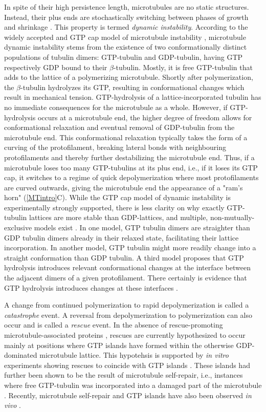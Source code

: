 In spite of their high persistence length, microtubules are no static structures. Instead, their plus ends are stochastically switching between phases of growth and shrinkage \parencite{Janosi2002}. This property is termed \textit{dynamic instability}. According to the widely accepted and GTP cap model of microtubule instability , microtubule dynamic instability stems from the existence of two conformationally distinct populations of tubulin dimers: GTP-tubulin and GDP-tubulin, having GTP respectively GDP bound to their $\beta$-tubulin. Mostly, it is free GTP-tubulin that adds to the lattice of a polymerizing microtubule. Shortly after polymerization, the $\beta$-tubulin hydrolyzes its GTP, resulting in conformational changes which result in mechanical tension. GTP-hydrolysis of a lattice-incorporated tubulin has no immediate consequences for the microtubule as a whole. However, if GTP-hydrolysis occurs at a microtubule end, the higher degree of freedom allows for conformational relaxation and eventual removal of GDP-tubulin from the microtubule end. This conformational relaxation typically takes the form of a curving of the protofilament, breaking lateral bonds with neighbouring protofilaments and thereby further destabilizing the microtubule end. Thus, if a microtubule loses too many GTP-tubulins at its plus end, i.e., if it loses its GTP cap, it switches to a regime of quick depolymerization where most protofilaments are curved outwards, giving the microtubule end the appearance of a "ram's horn" (\autoref{MTintro}C). While the GTP cap model of dynamic instability is experimentally strongly supported, there is less clarity on why exactly GTP-tubulin lattices are more stable than GDP-lattices, and multiple, non-mutually-exclusive models exist . In one model, GTP tubulin dimers are straighter than GDP tubulin dimers already in their relaxed state, facilitating their lattice incorporation. In another model, GTP tubulin might more readily change into a straight conformation than GDP tubulin. A third model proposes that GTP hydrolysis introduces relevant conformational changes at the interface between the adjacent dimers of a given protofilament. There certainly is evidence that GTP hydrolysis introduces changes at these interfaces .\par

A change from continued polymerization to rapid depolymerization is called a \textit{catastrophe} event. A reversal from depolymerization to polymerization can also occur and is called a \textit{rescue} event. In the absence of rescue-promoting microtubule-associated proteins , rescues are currently hypothesized to occur mainly at positions where GTP islands have formed within the otherwise GDP-dominated microtubule lattice. This hypotehsis is supported by \textit{in vitro} experiments showing rescues to coincide with GTP islands . These islands had further been shown to be the result of microtubule self-repair, i.e., instances where free GTP-tubulin was incorporated into a damaged part of the microtubule . Recently, microtubule self-repair and GTP islands have also been observed \textit{in vivo} .\par

